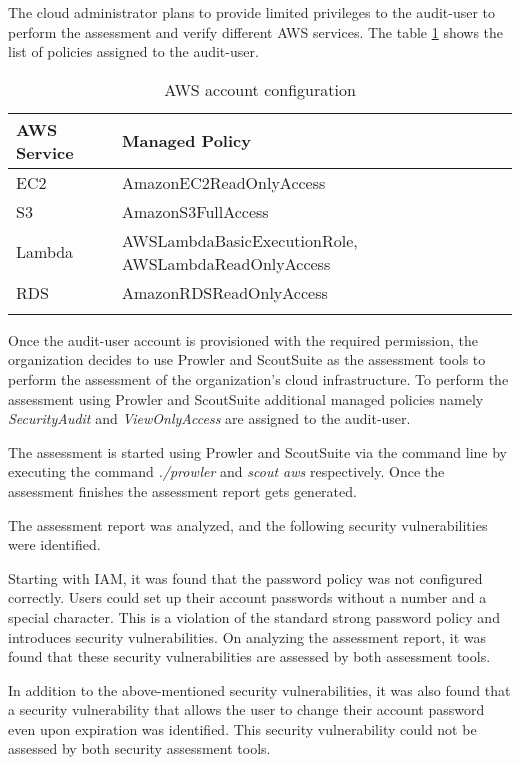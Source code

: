 The cloud administrator plans to provide limited privileges to the audit-user to perform the assessment and verify different AWS services.
The table \ref{tab:accountconfiguration} shows the list
of policies assigned to the audit-user.
\\
\begin{longtable}{|p{6cm}|p{8cm}|}
    \hline
    \textbf{AWS Service} & \textbf{Managed Policy}\\
    \hline
    EC2 & AmazonEC2ReadOnlyAccess \\
    \hline
    S3 & AmazonS3FullAccess \\
    \hline
    Lambda & AWSLambdaBasicExecutionRole,
    AWSLambdaReadOnlyAccess \\
    \hline
    RDS & AmazonRDSReadOnlyAccess \\
    \hline
    \caption{AWS account configuration}
    \label{tab:accountconfiguration}
\end{longtable}



\par Once the audit-user account is provisioned with the
required permission, the organization decides to
use Prowler and ScoutSuite as the assessment tools to perform the assessment of the organization’s cloud infrastructure.
To perform the assessment using Prowler and ScoutSuite additional managed policies namely \textit{SecurityAudit} and \textit{ViewOnlyAccess} are assigned to the audit-user.

\par The assessment is started using Prowler and ScoutSuite via the command line by executing the command \textit{./prowler} and \textit{scout aws} respectively.
Once the assessment finishes the assessment report gets generated.

\par The assessment report was analyzed, and the
following security vulnerabilities were identified.

\par Starting with IAM, it was found that the password policy was not configured correctly.
Users could set up their account passwords without a number and a special character.
This is a violation of the standard strong password policy and introduces security vulnerabilities.
On analyzing the assessment report, it was found that
these security vulnerabilities are assessed by both
assessment tools.

\par In addition to the above-mentioned security vulnerabilities, it was also found that a security vulnerability that allows the user to change their account password even upon expiration was identified.
This security vulnerability could not be assessed by both security assessment tools.

